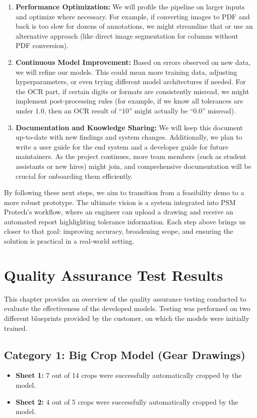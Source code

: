 \documentclass[11pt,a4paper]{article}
\begin{document}
\begin{enumerate}
  \item \textbf{Performance Optimization:} We will profile the pipeline on larger inputs and optimize where necessary. For example, if converting images to PDF and back is too slow for dozens of annotations, we might streamline that or use an alternative approach (like direct image segmentation for columns without PDF conversion).
  \item \textbf{Continuous Model Improvement:} Based on errors observed on new data, we will refine our models. This could mean more training data, adjusting hyperparameters, or even trying different model architectures if needed. For the OCR part, if certain digits or formats are consistently misread, we might implement post-processing rules (for example, if we know all tolerances are under 1.0, then an OCR result of “10” might actually be “0.0” misread).
  \item \textbf{Documentation and Knowledge Sharing:} We will keep this document up-to-date with new findings and system changes. Additionally, we plan to write a user guide for the end system and a developer guide for future maintainers. As the project continues, more team members (such as student assistants or new hires) might join, and comprehensive documentation will be crucial for onboarding them efficiently.
\end{enumerate}

By following these next steps, we aim to transition from a feasibility demo to a more robust prototype. The ultimate vision is a system integrated into PSM Protech’s workflow, where an engineer can upload a drawing and receive an automated report highlighting tolerance information. Each step above brings us closer to that goal: improving accuracy, broadening scope, and ensuring the solution is practical in a real-world setting.

\section{Quality Assurance Test Results}

This chapter provides an overview of the quality assurance testing conducted to evaluate the effectiveness of the developed models. Testing was performed on two different blueprints provided by the customer, on which the models were initially trained.

\subsection{Category 1: Big Crop Model (Gear Drawings)}
\begin{itemize}
  \item \textbf{Sheet 1:} 7 out of 14 crops were successfully automatically cropped by the model.
  \item \textbf{Sheet 2:} 4 out of 5 crops were successfully automatically cropped by the model.
\end{itemize}
\end{document}
